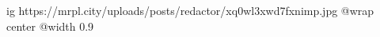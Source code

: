  
 
 
 
 

\ifcmt
  ig https://mrpl.city/uploads/posts/redactor/xq0wl3xwd7fxnimp.jpg
  @wrap center
  @width 0.9
\fi

